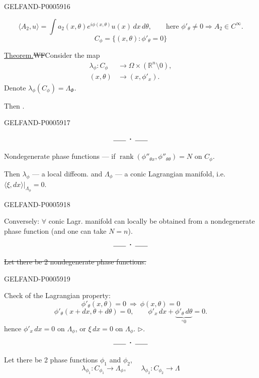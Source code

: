 \begin{GelfandAdjacentEvidence}{GELFAND-P000591}{6}


\[
\langle A_2,u\rangle=\int a_2(x,\theta)e^{i\phi(x,\theta)}u(x)\,dx\,d\theta,
\qquad\text{here }\phi'_\theta\ne0\Rightarrow A_2\in C^\infty.
\]
\[
C_\phi=\{(x,\theta):\phi'_\theta=0\}
\]

\underline{Theorem.}\quad\sout{WF}\quad Consider the map
\[
\begin{aligned}
\lambda_\phi:C_\phi &\longrightarrow\Omega\times(\mathbb R^n\setminus0),\\
(x,\theta)&\longrightarrow(x,\phi'_x).
\end{aligned}
\]
Denote \(\lambda_\phi(C_\phi)=\Lambda_\Phi\).

Then .
\end{GelfandAdjacentEvidence}
\begin{GelfandAdjacentEvidence}{GELFAND-P000591}{7}

\[
\rule{1.8em}{.4pt}\;\boldsymbol{\cdot}\;\rule{1.8em}{.4pt}
\]

Nondegenerate phase functions — if
\(\operatorname{rank}(\phi''_{\theta x},\phi''_{\theta\theta})=N\)
on \(C_\phi\).

Then \(\lambda_\phi\) — a local diffeom. and
\(\Lambda_\phi\) — a conic Lagrangian manifold,
i.e. \(\langle\xi,dx\rangle|_{\Lambda_\phi}=0\).
\end{GelfandAdjacentEvidence}
\begin{GelfandAdjacentEvidence}{GELFAND-P000591}{8}


Conversely: \(\forall\) conic Lagr. manifold can locally be obtained from a nondegenerate phase function
(and one can take \(N=n\)).
\[
\rule{1.8em}{.4pt}\;\boldsymbol{\cdot}\;\rule{1.8em}{.4pt}
\]

\sout{Let there be 2 nondegenerate phase functions.}
\end{GelfandAdjacentEvidence}
\begin{GelfandAdjacentEvidence}{GELFAND-P000591}{9}

Check of the Lagrangian property:
\[
\phi'_\theta(x,\theta)=0\ \Rightarrow\ \phi(x,\theta)=0
\]
\[
\phi'_\theta(x+dx,\theta+d\theta)=0,\qquad
\phi'_x\,dx+\underbrace{\phi'_\theta\,d\theta}_{\text{“}0}=0.
\]
hence \(\phi'_x\,dx=0\) on \(\Lambda_\phi\), or
\(\xi\,dx=0\) on \(\Lambda_\phi\). \(\triangleright\).
\[
\rule{1.8em}{.4pt}\;\boldsymbol{\cdot}\;\rule{1.8em}{.4pt}
\]

Let there be 2 phase functions \(\phi_1\) and \(\phi_2\),
\[
\lambda_{\phi_1}:C_{\phi_1}\to\Lambda_\phi,\qquad
\lambda_{\phi_2}:C_{\phi_2}\to\Lambda
\]
\end{GelfandAdjacentEvidence}
